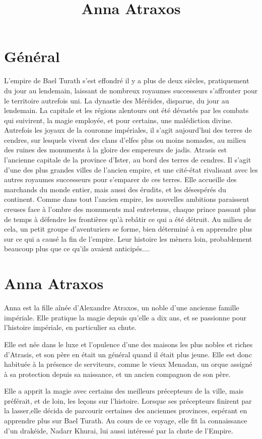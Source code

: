 \documentclass[10pt,a4paper]{article}
\author{ }
\title{Anna Atraxos}
\begin{document}
\section{Général}
L'empire de Bael Turath s'est effondré il y a plus de deux siècles, pratiquement du jour au lendemain, laissant de nombreux royaumes successeurs s'affronter pour le territoire autrefois uni. La dynastie des Méréides, disparue, du jour au lendemain. La capitale et les régions alentours ont été dévastés par les combats qui suivirent, la magie employée, et pour certains, une malédiction divine. Autrefois les joyaux de la couronne impériales, il s'agit aujourd'hui des terres de cendres, sur lesquels vivent des clans d'elfes plus ou moins nomades, au milieu des ruines des monuments à la gloire des empereurs de jadis.
Atrasis est l'ancienne capitale de la province d'Ister, au bord des terres de cendres. Il s'agit d'une des plus grandes villes de l'ancien empire, et une cité-état rivalisant avec les autres royaumes successeurs pour s'emparer de ces terres. Elle accueille des marchands du monde entier, mais aussi des érudits, et les désespérés du continent.
Comme dans tout l'ancien empire, les nouvelles ambitions paraissent creuses face à l'ombre des monuments mal entretenus, chaque prince passant plus de temps à défendre les frontières qu'à rebâtir ce qui a été détruit.
Au milieu de cela, un petit groupe d'aventuriers se forme, bien déterminé à en apprendre plus sur ce qui a causé la fin de l'empire. Leur histoire les mènera loin, probablement beaucoup plus que ce qu'ils avaient anticipés....
\section{Anna Atraxos}
Anna est la fille aînée d'Alexandre Atraxos, un noble d'une ancienne famille impériale. Elle pratique la magie depuis qu'elle a dix ans, et se passionne pour l'histoire impériale, en particulier sa chute.

Elle est née dans le luxe et l'opulence d'une des maisons les plus nobles et riches d'Atrasis, et son père en était un général quand il était plus jeune. Elle est donc habituée à la présence de serviteurs, comme le vieux Menadan, un orque assigné à sa protection depuis sa naissance, et un ancien compagnon de son père. 

Elle a apprit la magie avec certains des meilleurs précepteurs de la ville, mais préférait, et de loin, les leçons sur l'histoire. Lorsque ses précepteurs finirent par la lasser,elle décida de parcourir certaines des anciennes provinces, espérant en apprendre plus sur Bael Turath. Au cours de ce voyage, elle fit la connaissance d'un drakéide, Nadarr Khurai, lui aussi intéressé par la chute de l'Empire.
\end{document}

